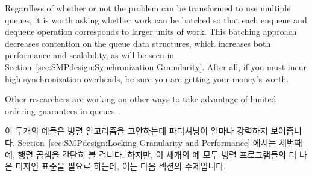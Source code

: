 {	Regardless of whether or not the problem can be transformed
	to use multiple queues, it is worth asking whether work can
	be batched so that each enqueue and dequeue operation corresponds
	to larger units of work.
	This batching approach decreases contention on the queue data
	structures, which increases both performance and scalability,
	as will be seen in
	Section~\ref{sec:SMPdesign:Synchronization Granularity}.
	After all, if you must incur high synchronization overheads,
	be sure you are getting your money's worth.

	Other researchers are working on other ways to take advantage
	of limited ordering guarantees in
	queues~\cite{ChristophMKirsch2012FIFOisntTR}.
	\fi
} \QuickQuizEnd

이 두개의 예들은 병렬 알고리즘을 고안하는데 파티셔닝이 얼마나 강력하지
보여줍니다.
Section~\ref{sec:SMPdesign:Locking Granularity and Performance} 에서는 세번째
예, 행렬 곱셈을 간단히 볼 겁니다.
하지만, 이 세개의 예 모두 병렬 프로그램들의 더 나은 디자인 표준을 필요로
하는데, 이는 다음 섹션의 주제입니다.

